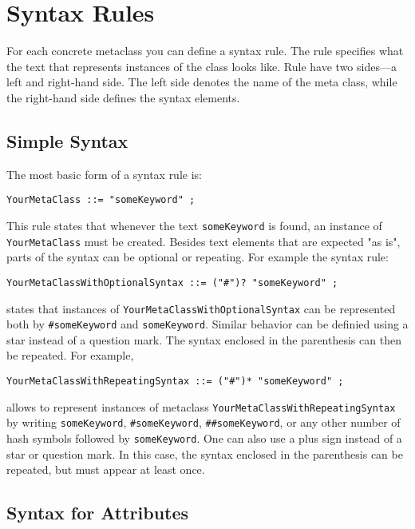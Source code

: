 \section{Syntax Rules}

For each concrete metaclass you can define a syntax rule. The rule specifies
what the text that represents instances of the class looks like. Rule have two
sides---a left and right-hand side. The left side denotes the name of the meta
class, while the right-hand side defines the syntax elements.

\subsection{Simple Syntax}

The most basic form of a syntax rule is:

\begin{lstlisting}
YourMetaClass ::= "someKeyword" ;
\end{lstlisting}

This rule states that whenever the text \texttt{someKeyword} is found, an
instance of \texttt{YourMetaClass} must be created. Besides text elements that are
expected "as is", parts of the syntax can be optional or repeating. For example 
the syntax rule:

\begin{lstlisting}
YourMetaClassWithOptionalSyntax ::= ("#")? "someKeyword" ;
\end{lstlisting}

states that instances of \texttt{YourMetaClassWithOptionalSyntax} can be
represented both by \texttt{\#someKeyword} and \texttt{someKeyword}. Similar
behavior can be definied using a star instead of a question mark. The syntax 
enclosed in the parenthesis can then be repeated. For example,

\begin{lstlisting}
YourMetaClassWithRepeatingSyntax ::= ("#")* "someKeyword" ;
\end{lstlisting}

allows to represent instances of metaclass
\texttt{YourMetaClassWithRepeatingSyntax} by writing \texttt{someKeyword},
\texttt{\#someKeyword}, \texttt{\#\#someKeyword}, or any other number of hash
symbols followed by \texttt{someKeyword}.
One can also use a plus sign instead of a star or question mark. In this case,
the syntax enclosed in the parenthesis can be repeated, but must appear at least
once.

\subsection{Syntax for Attributes}

